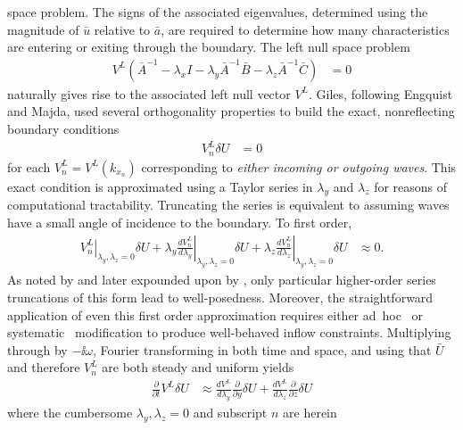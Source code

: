 space problem.  The signs of the associated eigenvalues, determined using the
magnitude of $\bar{u}$ relative to $\bar{a}$, are required to determine how
many characteristics are entering or exiting through the boundary.  The left
null space problem
\begin{align}
\label{eq:dimeulereigenprob}
  V^{L}
  \left(   \bar{A}^{-1}
         - \lambda_x I
         - \lambda_y \bar{A}^{-1} \bar{B}
         - \lambda_z \bar{A}^{-1} \bar{C}
  \right) &= 0
\end{align}
naturally gives rise to the associated left null vector $V^L$.  Giles,
following Engquist and Majda, used several orthogonality properties to build
the exact, nonreflecting boundary conditions
\begin{align}
\label{eq:dimeulerexact}
  V_n^L \delta{}U &= 0
\end{align}
for each $V_n^L = V^L\!\left(k_{x_n}\right)$ corresponding to \textit{either
incoming or outgoing waves}.  This exact condition is approximated using a
Taylor series in $\lambda_y$ and $\lambda_z$ for reasons of computational
tractability.  Truncating the series is equivalent to assuming waves have a
small angle of incidence to the boundary.  To first order,
\begin{align}
  \left.V_n^L\right|_{\lambda_y,\lambda_z=0}
  \delta{}U
  +
  \lambda_y
  \left.\frac{dV_n^L}{d\lambda_y}\right|_{\lambda_y,\lambda_z=0}
  \delta{}U
  +
  \lambda_z
  \left.\frac{dV_n^L}{d\lambda_z}\right|_{\lambda_y,\lambda_z=0}
  \delta{}U
  &\approx 0
  .
\end{align}
As noted by \citet{Engquist1977Absorbing} and later expounded upon by
\citet{Trefethen1986Wellposedness}, only particular higher-order series
truncations of this form lead to well-posedness.  Moreover, the straightforward
application of even this first order approximation requires either
ad~hoc~\citep{Giles1988Nonreflecting,Medida2007} or
systematic~\citep{Rowley2000Discretely} modification to produce well-behaved
inflow constraints.  Multiplying through by $-\ii\omega$, Fourier transforming
in both time and space, and using that $\bar{U}$ and therefore $V_n^L$ are both
steady and uniform yields
\begin{align}
\label{eq:dimeulerapprox}
  \frac{\partial}{\partial{}t}
  V^L
  \delta{}U
  &\approx
  \frac{dV^L}{d\lambda_y}
  \frac{\partial}{\partial{}y}\delta{}U
  +
  \frac{dV^L}{d\lambda_z}
  \frac{\partial}{\partial{}z}\delta{}U
\end{align}
where the cumbersome $\lambda_y,\lambda_z=0$ and subscript $n$ are herein
